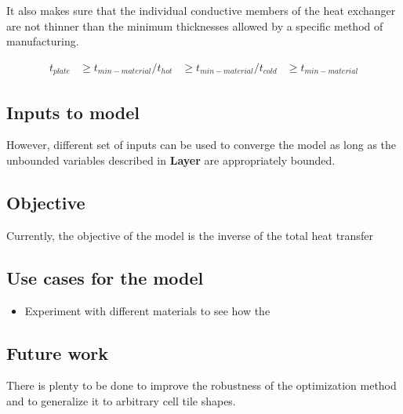 \documentclass{article}
\begin{document}
It also makes sure that the individual conductive members of the heat exchanger are not thinner than the minimum thicknesses allowed by a specific method of manufacturing. 

\begin{align}
    t_{plate} &\geq t_{min-material} /
    t_{hot}  &\geq t_{min-material} /
    t_{cold} &\geq t_{min-material} 
\end{align}

\subsection{Inputs to model}


However, different set of inputs can be used to converge the model as long as the unbounded variables described in \textbf{Layer} are appropriately bounded. 

\subsection{Objective}

Currently, the objective of the model is the inverse of the total heat transfer 

\subsection{Use cases for the model}

\begin{itemize}
    \item Experiment with different materials to see how the 
\end{itemize}

\subsection{Future work}

There is plenty to be done to improve the robustness of the optimization method and to generalize it to arbitrary cell tile shapes. 
\end{document}

